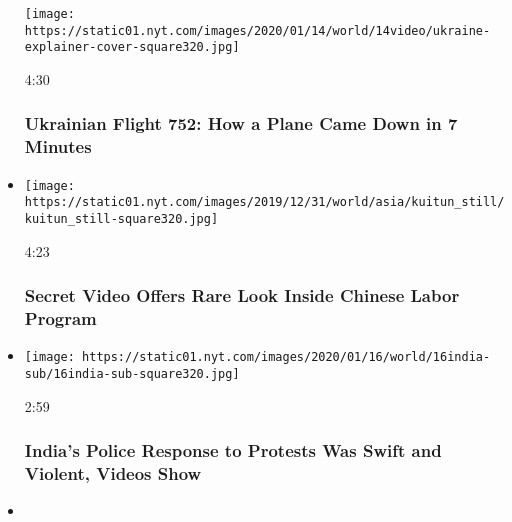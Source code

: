 \begin{itemize}
  \texttt{[image: https://static01.nyt.com/images/2020/01/14/world/14video/ukraine-explainer-cover-square320.jpg]}

  4:30

  \hypertarget{ukrainian-flight-752-how-a-plane-came-down-in-7-minutes}{%
  \subsubsection{Ukrainian Flight 752: How a Plane Came Down in 7
  Minutes}\label{ukrainian-flight-752-how-a-plane-came-down-in-7-minutes}}
\item
  \href{https://www.nytimes.com/video/world/asia/100000006874372/chinese-labor-uighurs.html?action=click\&module=video-series-bar\&region=header\&pgtype=Article\&playlistId=video/investigations}{}

  \texttt{[image: https://static01.nyt.com/images/2019/12/31/world/asia/kuitun\_still/kuitun\_still-square320.jpg]}

  4:23

  \hypertarget{secret-video-offers-rare-look-inside-chinese-labor-program}{%
  \subsubsection{Secret Video Offers Rare Look Inside Chinese Labor
  Program}\label{secret-video-offers-rare-look-inside-chinese-labor-program}}
\item
  \href{https://www.nytimes.com/video/world/asia/100000006877279/india-protests-police.html?action=click\&module=video-series-bar\&region=header\&pgtype=Article\&playlistId=video/investigations}{}

  \texttt{[image: https://static01.nyt.com/images/2020/01/16/world/16india-sub/16india-sub-square320.jpg]}

  2:59

  \hypertarget{indias-police-response-to-protests-was-swift-and-violent-videos-show}{%
  \subsubsection{India's Police Response to Protests Was Swift and
  Violent, Videos
  Show}\label{indias-police-response-to-protests-was-swift-and-violent-videos-show}}
\item
  \href{https://www.nytimes.com/video/world/middleeast/100000006818506/russia-bombs-syria-civlians.html?action=click\&module=video-series-bar\&region=header\&pgtype=Article\&playlistId=video/investigations}{}


\end{itemize}
